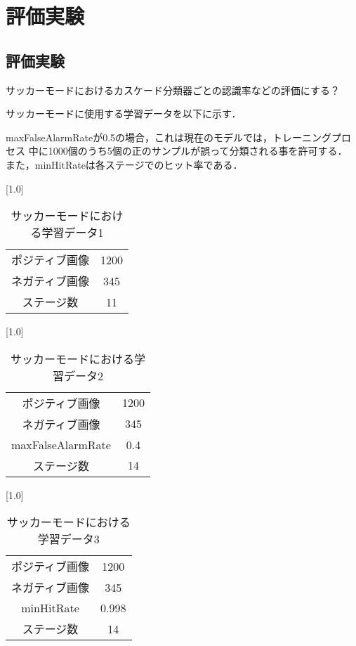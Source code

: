 \chapter{評価実験}
\thispagestyle{fancy}


\section{評価実験}
サッカーモードにおけるカスケード分類器ごとの認識率などの評価にする？


サッカーモードに使用する学習データを以下に示す．

maxFalseAlarmRateが0.5の場合，これは現在のモデルでは，トレーニングプロセス
中に1000個のうち5個の正のサンプルが誤って分類される事を許可する．
また，minHitRateは各ステージでのヒット率である．

\vspace{1cm}

\begin{table}[h]
  \centering
  \scalebox{1.0}[1.0]{
   \begin{tabular}{cc}	\hline
     ポジティブ画像 & 1200  \\    
     ネガティブ画像 & 345  \\
     ステージ数 & 11  \\ \hline
   \end{tabular}
  } 
  \caption{サッカーモードにおける学習データ1}
  \label{soccerstudy}
\end{table}


\begin{table}[h]
  \centering
  \scalebox{1.0}[1.0]{
   \begin{tabular}{cc}	\hline
     ポジティブ画像 & 1200  \\    
     ネガティブ画像 & 345  \\
     maxFalseAlarmRate & 0.4 \\
     ステージ数 & 14  \\ \hline
   \end{tabular}
  } 
  \caption{サッカーモードにおける学習データ2}
  \label{soccerstudy}
\end{table}


\begin{table}[h]
  \centering
  \scalebox{1.0}[1.0]{
   \begin{tabular}{cc}	\hline
     ポジティブ画像 & 1200  \\    
     ネガティブ画像 & 345  \\
     minHitRate & 0.998 \\
     ステージ数 & 14  \\ \hline
   \end{tabular}
  } 
  \caption{サッカーモードにおける学習データ3}
  \label{soccerstudy}
\end{table}


